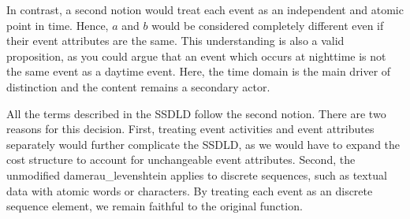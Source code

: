 \documentclass[./../../paper.tex]{subfiles}
\begin{document}
In contrast, a second notion would treat each event as an independent and atomic point in time. Hence, $a$ and $b$ would be considered completely different even if their event attributes are the same. This understanding is also a valid proposition, as you could argue that an event which occurs at nighttime is not the same event as a daytime event. Here, the time domain is the main driver of distinction and the content remains a secondary actor. 

All the terms described in the \gls{SSDLD} follow the second notion. There are two reasons for this decision. First, treating event activities and event attributes separately would further complicate the \gls{SSDLD}, as we would have to expand the cost structure to account for unchangeable event attributes. Second, the unmodified \gls{damerau_levenshtein} applies to discrete sequences, such as textual data with atomic words or characters. By treating each event as an discrete sequence element, we remain faithful to the original function. 
\end{document}
